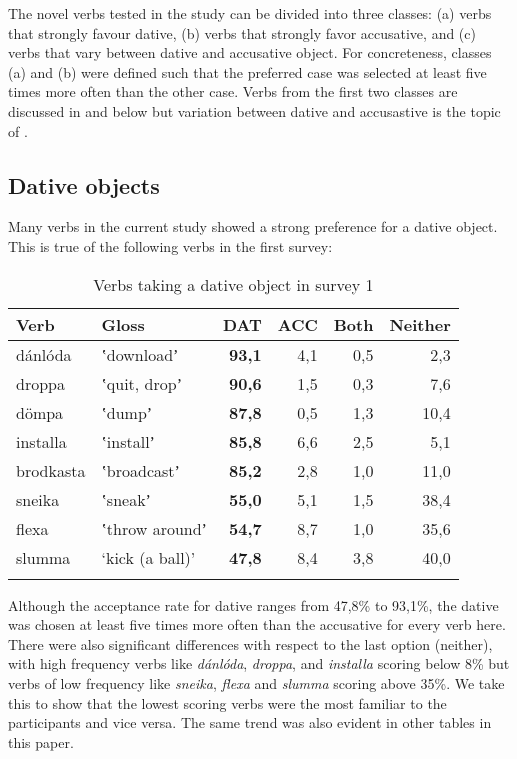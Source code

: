 \documentclass[output=paper,modfonts,nonflat,colorlinks,citecolor=brown]{langsci/langscibook}
\begin{document}
The novel verbs tested in the study can be divided into three classes: (a) verbs that strongly favour dative, (b) verbs that strongly favor accusative, and (c) verbs that vary between dative and accusative object. For concreteness, classes (a) and (b) were defined such that the preferred case was selected at least five times more often than the other case. Verbs from the first two classes are discussed in  and  below but variation between dative and accusastive is the topic of .

\subsection{Dative objects} %
\label{sec:jonsson:3.2}

Many verbs in the current study showed a strong preference for a dative object. This is true of the following verbs in the first survey:

\begin{table}
\caption{\label{tab:jonsson:1}Verbs taking a dative object in survey 1}
\begin{tabularx}{\textwidth}{XXrrrr}
\lsptoprule
Verb & Gloss & \textbf{DAT} & ACC & Both & Neither\\
\midrule
dánlóda & ʽdownloadʼ & \textbf{93,1} & 4,1 & 0,5 & 2,3\\
droppa & ʽquit, dropʼ & \textbf{90,6} & 1,5 & 0,3 & 7,6\\
dömpa & ʽdumpʼ & \textbf{87,8} & 0,5 & 1,3 & 10,4\\
installa & ʽinstallʼ & \textbf{85,8} & 6,6 & 2,5 & 5,1\\
brodkasta & ʽbroadcastʼ & \textbf{85,2} & 2,8 & 1,0 & 11,0\\
sneika & ʽsneakʼ & \textbf{55,0} & 5,1 & 1,5 & 38,4\\
flexa & ʽthrow aroundʼ & \textbf{54,7} & 8,7 & 1,0 & 35,6\\
slumma & ‘kick (a ball)’ & \textbf{47,8} & 8,4 & 3,8 & 40,0\\
\lspbottomrule
\end{tabularx}
\end{table}

Although the acceptance rate for dative ranges from 47,8\% to 93,1\%, the dative was chosen at least five times more often than the accusative for every verb here. There were also significant differences with respect to the last option (neither), with high frequency verbs like \textit{dánlóda}, \textit{droppa}, and \textit{installa} scoring below 8\% but verbs of low frequency like \textit{sneika}, \textit{flexa} and \textit{slumma} scoring above 35\%. We take this to show that the lowest scoring verbs were the most familiar to the participants and vice versa. The same trend was also evident in other tables in this paper.
\end{document}
